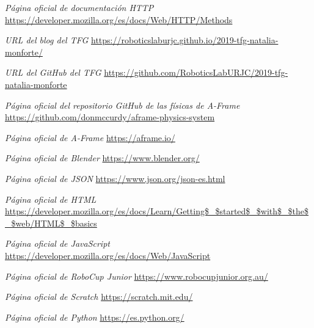 \textit{Página oficial de documentación \textit{HTTP}}\newline
\url{https://developer.mozilla.org/es/docs/Web/HTTP/Methods}\newline

\textit{URL del blog del TFG}\newline
\url{https://roboticslaburjc.github.io/2019-tfg-natalia-monforte/}\newline

\textit{URL del GitHub del TFG}\newline
\url{https://github.com/RoboticsLabURJC/2019-tfg-natalia-monforte}\newline

\textit{Página oficial del repositorio GitHub de las físicas de \textit{A-Frame}}\newline
\url{https://github.com/donmccurdy/aframe-physics-system}\newline

\textit{Página oficial de \textit{A-Frame}}\newline
\url{https://aframe.io/}\newline

\textit{Página oficial de \textit{Blender}}\newline
\url{https://www.blender.org/}\newline

\clearpage
\textit{Página oficial de \textit{JSON}}\newline
\url{https://www.json.org/json-es.html}\newline

\textit{Página oficial de \textit{HTML}}\newline
\url{https://developer.mozilla.org/es/docs/Learn/Getting$_$started$_$with$_$the$_$web/HTML$_$basics}\newline

\textit{Página oficial de \textit{JavaScript}}\newline
\url{https://developer.mozilla.org/es/docs/Web/JavaScript}\newline

\textit{Página oficial de \textit{RoboCup Junior}}\newline
\url{https://www.robocupjunior.org.au/}\newline

\textit{Página oficial de \textit{Scratch}}\newline
\url{https://scratch.mit.edu/}\newline

\textit{Página oficial de \textit{Python}}\newline
\url{https://es.python.org/}